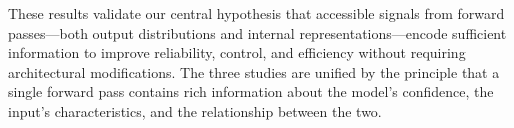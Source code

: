 These results validate our central hypothesis that accessible signals from forward passes---both output distributions and internal representations---encode sufficient information to improve reliability, control, and efficiency without requiring architectural modifications. The three studies are unified by the principle that a single forward pass contains rich information about the model's confidence, the input's characteristics, and the relationship between the two.

